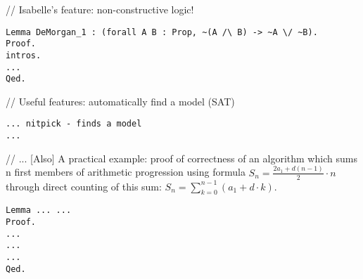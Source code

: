 \documentclass[article]{aaltoseries}
\begin{document}
%
























// Isabelle's feature: non-constructive logic!
\begin{lstlisting}[caption={Propositional logic proof to the contrary}]
Lemma DeMorgan_1 : (forall A B : Prop, ~(A /\ B) -> ~A \/ ~B).
Proof.
intros.
...
Qed.
\end{lstlisting}

// Useful features: automatically find a model (SAT)
\begin{lstlisting}[caption={Isabelle as an SAT solver}]
... nitpick - finds a model
...
\end{lstlisting}





// ... [Also] A practical example: proof of correctness of an algorithm which sums n first members of arithmetic progression using formula $S_{n} = { {\frac {2 a_{1} + d (n - 1)}{2} \cdot n}}$ through direct counting of this sum: $S_{n} = \sum\limits_{k=0}^{n-1} (a_{1} + d \cdot k)$.
\begin{lstlisting}[caption={First-order logic proof: formula of the sum of n first members of arithmetic progression}]
Lemma ... ... 
Proof.
...
...
...
Qed.
\end{lstlisting}
\end{document}
